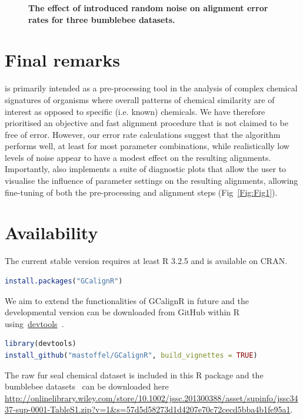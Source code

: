 \documentclass[10pt,letterpaper]{article}
\begin{document}
\begin{figure}[htbp]
\centering
\caption{\textbf{The effect of introduced random noise on alignment error rates for three bumblebee datasets.}}
\label{Fig:Fig8}
\end{figure} 

\section*{Final remarks}
 is primarily intended as a pre-processing tool in the analysis of complex chemical signatures of organisms where overall patterns of chemical similarity are of interest as opposed to specific (i.e. known) chemicals. We have therefore prioritised an objective and fast alignment procedure that is not claimed to be free of error.  However, our error rate calculations suggest that the algorithm performs well, at least for most parameter combinations, while realistically low levels of noise appear to have a modest effect on the resulting alignments. Importantly,  also implements a suite of diagnostic plots that allow the user to visualise the influence of parameter settings on the resulting alignments, allowing fine-tuning of both the pre-processing and alignment steps (Fig~\ref{Fig:Fig1}).

\section*{Availability}
The current stable version requires at least R 3.2.5 and is available on CRAN.

\begin{lstlisting}[language=R]
install.packages("GCalignR")
\end{lstlisting}

We aim to extend the functionalities of GCalignR in future and the developmental version can be downloaded from GitHub within R using~\href{https://cran.r-project.org/web/packages/devtools/index.html}{devtools}~\cite{Wickham.2016}. 

\begin{lstlisting}[language=R]
library(devtools)
install_github("mastoffel/GCalignR", build_vignettes = TRUE)
\end{lstlisting}

The raw fur seal chemical dataset is included in this R package and the bumblebee datasets~\cite{Dellicour.2013} can be downloaded here \url{http://onlinelibrary.wiley.com/store/10.1002/jssc.201300388/asset/supinfo/jssc3437-sup-0001-TableS1.zip?v=1&s=57d5d58273d1d4207e70c72cecd5bba4b1fe95a1}.
\end{document}
